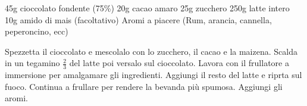 \begin{ingreds}
	45g cioccolato fondente (75\%)
	20g cacao amaro
	25g zucchero
	250g latte intero
	10g amido di mais (facoltativo)
	Aromi a piacere (Rum, arancia, cannella, peperoncino, ecc)

\end{ingreds}

\begin{method}
Spezzetta il cioccolato e mescolalo con lo zucchero, il cacao e la maizena. Scalda in un tegamino $\frac{2}{3}$ del latte poi versalo sul cioccolato. Lavora con il frullatore a immersione per amalgamare gli ingredienti. Aggiungi il resto del latte e riprta sul fuoco. Continua a frullare per rendere la bevanda più spumosa. Aggiungi gli aromi.
\end{method}



